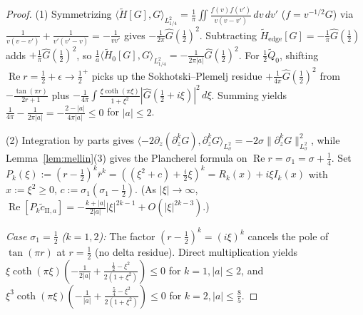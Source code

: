 \documentclass[11pt,a4paper]{article}
\begin{document}
\begin{proof}
(1) Symmetrizing $\langle \widetilde{H}[G], G\rangle_{L^2_{1/4}} = \frac{1}{\pi}\iint \frac{f(v)f(v')}{v(v-v')}\,dv\,dv'$ ($f = v^{-1/2}G$) via $\frac{1}{v(v-v')} + \frac{1}{v'(v'-v)} = -\frac{1}{vv'}$ gives $-\frac{1}{2\pi}\widehat{G}(\frac{1}{2})^2$. Subtracting $\widetilde{H}_{\mathrm{edge}}[G] = -\frac{1}{\pi}\widehat{G}(\frac{1}{2})$ adds $+\frac{1}{\pi}\widehat{G}(\frac{1}{2})^2$, so $\frac{1}{a}\langle \widetilde{H}_0[G], G\rangle_{L^2_{1/4}} = -\frac{1}{2\pi|a|}\widehat{G}(\frac{1}{2})^2$. For $\frac{1}{2}\widetilde{Q}_0$, shifting $\operatorname{Re} r = \frac{1}{2}+\epsilon \to \frac{1}{2}^+$ picks up the Sokhotski--Plemelj residue $+\frac{1}{4\pi}\widehat{G}(\frac{1}{2})^2$ from $-\frac{\tan(\pi r)}{2r+1}$ plus $-\frac{1}{4\pi}\int \frac{\xi\coth(\pi\xi)}{1+\xi^2}|\widehat{G}(\frac{1}{2}+i\xi)|^2\,d\xi$. Summing yields $\frac{1}{4\pi} - \frac{1}{2\pi|a|} = -\frac{2-|a|}{4\pi|a|} \le 0$ for $|a| \le 2$.

(2) Integration by parts gives $\langle -2\partial_z(\partial_z^k G), \partial_z^k G\rangle_{L^2_\sigma} = -2\sigma\|\partial_z^k G\|_{L^2_\sigma}^2$, while Lemma~\ref{lem:mellin}(3) gives the Plancherel formula on $\operatorname{Re} r = \sigma_1 = \sigma + \frac{1}{4}$. Set $P_k(\xi) := (r-\frac{1}{2})^k\bar r^k = ((\xi^2 + c) + \frac{i}{2}\xi)^k = R_k(x) + i\xi I_k(x)$ with $x := \xi^2 \ge 0$, $c := \sigma_1(\sigma_1-\frac{1}{2})$. (As $|\xi|\to\infty$, $\operatorname{Re}[P_k\tilde c_{\mathrm{II},a}] = -\frac{k+|a|}{2|a|}|\xi|^{2k-1} + O(|\xi|^{2k-3})$.)

\emph{Case $\sigma_1 = \frac{1}{2}$ ($k=1,2$):} The factor $(r-\frac{1}{2})^k = (i\xi)^k$ cancels the pole of $\tan(\pi r)$ at $r=\frac{1}{2}$ (no delta residue). Direct multiplication yields $\xi\coth(\pi\xi)(-\frac{1}{2|a|} + \frac{\frac{1}{2}-\xi^2}{2(1+\xi^2)}) \le 0$ for $k=1, |a|\le 2$, and $\xi^3\coth(\pi\xi)(-\frac{1}{|a|} + \frac{\frac{5}{4}-\xi^2}{2(1+\xi^2)}) \le 0$ for $k=2, |a|\le \frac{8}{5}$.


\end{proof}
\end{document}
